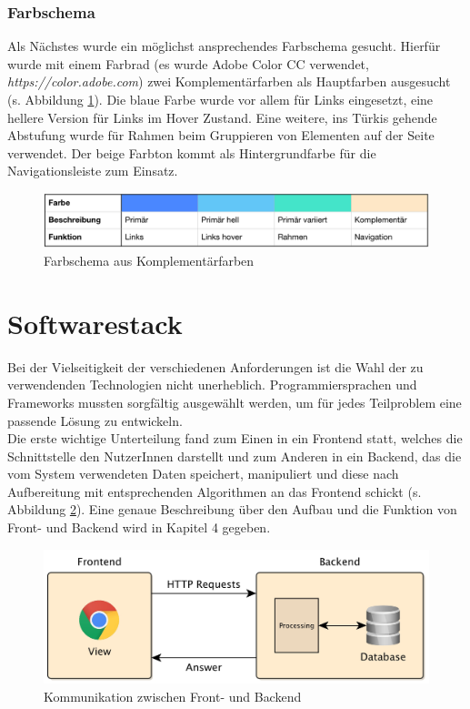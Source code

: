 \subsubsection{Farbschema}

Als Nächstes wurde ein möglichst ansprechendes Farbschema gesucht. Hierfür wurde mit einem Farbrad (es wurde Adobe Color CC verwendet, \textit{https://color.adobe.com}) zwei Komplementärfarben als Hauptfarben ausgesucht (s. Abbildung \ref{fig:colors}). Die blaue Farbe wurde vor allem für Links eingesetzt, eine hellere Version für Links im Hover Zustand. Eine weitere, ins Türkis gehende Abstufung wurde für Rahmen beim Gruppieren von Elementen auf der Seite verwendet. Der beige Farbton kommt als Hintergrundfarbe für die Navigationsleiste zum Einsatz.

\begin{figure}[h!]
	\centering
	\includegraphics[width=.95\linewidth]{figures/farbschema}
	\caption{Farbschema aus Komplementärfarben}
	\label{fig:colors}
\end{figure}


\section{Softwarestack}

Bei der Vielseitigkeit der verschiedenen Anforderungen ist die Wahl der zu verwendenden Technologien nicht unerheblich. Programmiersprachen und Frameworks mussten sorgfältig ausgewählt werden, um für jedes Teilproblem eine passende Lösung zu entwickeln.\\
Die erste wichtige Unterteilung fand zum Einen in ein Frontend statt, welches die Schnittstelle den NutzerInnen darstellt und zum Anderen in ein Backend, das die vom System verwendeten Daten speichert, manipuliert und diese nach Aufbereitung mit entsprechenden Algorithmen an das Frontend schickt (s. Abbildung \ref{fig:frontendbackend}). Eine genaue Beschreibung über den Aufbau und die Funktion von Front- und Backend wird in Kapitel 4 gegeben.\\

\begin{figure}[h!]
	\centering
	\includegraphics[width=.8\linewidth]{figures/frontendbackend}
	\caption{Kommunikation zwischen Front- und Backend}
	\label{fig:frontendbackend}
\end{figure}

